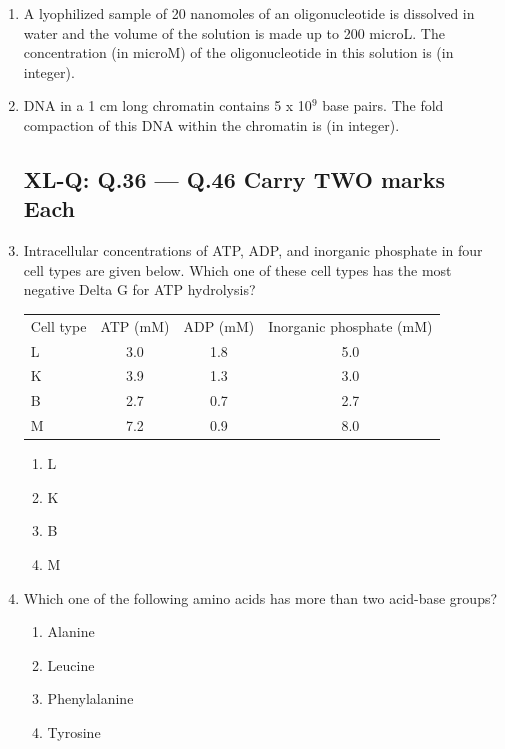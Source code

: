 \documentclass[journal,12pt,onecolumn]{IEEEtran}
\begin{document}
\begin{enumerate}
    \item A lyophilized sample of 20 nanomoles of an oligonucleotide is dissolved in water and the volume of the solution is made up to 200 microL. The concentration (in microM) of the oligonucleotide in this solution is (in integer).

    \item DNA in a 1 cm long chromatin contains 5 x 10$^9$ base pairs. The fold compaction of this DNA within the chromatin is (in integer).

\subsection*{XL-Q: Q.36 --- Q.46 Carry TWO marks Each}

    \item Intracellular concentrations of ATP, ADP, and inorganic phosphate in four cell types are given below. Which one of these cell types has the most negative Delta G for ATP hydrolysis?\\
    \begin{tabular}{lccc}
    Cell type & ATP (mM) & ADP (mM) & Inorganic phosphate (mM) \\
    L & 3.0 & 1.8 & 5.0 \\
    K & 3.9 & 1.3 & 3.0 \\
    B & 2.7 & 0.7 & 2.7 \\
    M & 7.2 & 0.9 & 8.0 \\
    \end{tabular}
    \begin{enumerate}
        \item L
        \item K
        \item B
        \item M
    \end{enumerate}

    \item Which one of the following amino acids has more than two acid-base groups?
    \begin{enumerate}
        \item Alanine
        \item Leucine
        \item Phenylalanine
        \item Tyrosine
    \end{enumerate}


\end{enumerate}
\end{document}
